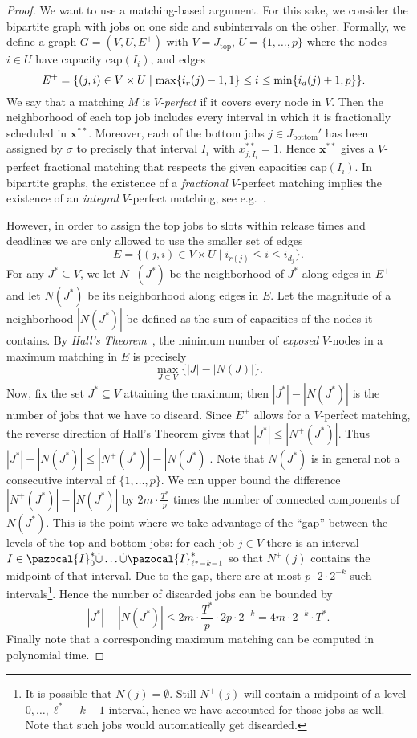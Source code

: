 \documentclass[11pt,letterpaper,oneside,english]{article}
\theoremstyle{theorem}
\begin{document}
\begin{proof}
We want to use a matching-based argument.
For this sake, we consider the bipartite graph with jobs on one side and subintervals on the other. Formally, we define a graph $G = (V, U, E^+)$ with $V = J_{\textrm{top}}$, $U = \{1,\ldots,p\}$ where the nodes $i \in U$ have capacity $\textrm{cap}(I_i)$, and edges 
\[
\hspace{-3mm} E^+ = \{(j,i) \in V \times U  \mid \max\{i_{r}(j) - 1, 1\} \leq i \leq \min\{i_{d}(j)+1,p\}\}.
\]
We say that a matching $M$ is \emph{$V$-perfect} if it covers every node in $V$.
Then the neighborhood of each top job includes every interval in which it is fractionally scheduled in $\bm{x}^{**}$. Moreover, each of the bottom jobs $j \in J_{\textrm{bottom}}'$ has been 
assigned by $\sigma$ to precisely that interval $I_i$ with $x_{j,I_i}^{**}=1$. Hence $\bm{x}^{**}$ gives a
$V$-perfect fractional matching that respects the given capacities $\textrm{cap}(I_i)$.
In bipartite graphs, the existence of a \emph{fractional} $V$-perfect matching implies
the existence of an \emph{integral} $V$-perfect matching, see e.g.~\cite{CombinatorialOptimizationBook-Schrijver-2003}. 

However, in order to assign the top jobs to slots within release times and deadlines
we are only allowed to use the smaller set of edges
\[
E = \{(j,i) \in V \times U \mid i_{r(j)} \leq i \leq i_{d_j}\}.
\]
For any $J^* \subseteq V$, we let $N^+(J^*)$ be the neighborhood of $J^*$ along edges in $E^+$ and let $N(J^*)$ be its neighborhood along edges in $E$. Let the magnitude of a neighborhood $|N(J^*)|$ be defined as the sum of capacities of the nodes it contains.
By \emph{Hall's Theorem}~\cite{CombinatorialOptimizationBook-Schrijver-2003}, the minimum number of \emph{exposed} $V$-nodes in a maximum matching in $E$ is precisely
\[
  \max_{J \subseteq V} \{ |J| - |N(J)| \}.
\]
Now, fix the set $J^* \subseteq V$ attaining the maximum; then $|J^*| - |N(J^*)|$
is the number of jobs that we have to discard. Since $E^+$ allows for a 
$V$-perfect matching, the reverse direction of Hall's Theorem gives that
$|J^*| \leq |N^+(J^*)|$. Thus $|J^*| - |N(J^*)| \leq |N^+(J^*)| - |N(J^*)|$.
Note that $N(J^*)$ is in general not a consecutive interval of $\{1,\ldots,p\}$.
We can upper bound the difference $|N^+(J^*)| - |N(J^*)|$ by $2m \cdot \frac{T^*}{p}$
times the number of connected components of $N(J^*)$. 
This is the point where we take advantage of the ``gap'' between the levels of the top and bottom jobs: for each job $j \in V$ there is an interval $I \in \pazocal{I}_0^* \dot{\cup} \ldots \dot{\cup} \pazocal{I}_{\ell^* - k - 1}^*$ so that $N^+(j)$
contains the midpoint of that interval. Due to the gap, there are at most $p \cdot 2\cdot 2^{-k}$ such intervals\footnote{It is possible that $N(j)=\emptyset$. Still $N^+(j)$ will contain a midpoint of a level $0,\ldots,\ell^*-k-1$ interval, hence we have accounted for those jobs as well. Note that such jobs would automatically get discarded.}. Hence the number of discarded jobs can be bounded by
\[
  |J^*| - |N(J^*)| \leq 2m \cdot \frac{T^*}{p} \cdot 2p \cdot 2^{-k} = 4m \cdot 2^{-k} \cdot T^*. \]
Finally note that a corresponding maximum matching can be computed in polynomial time.
\end{proof}
\end{document}
